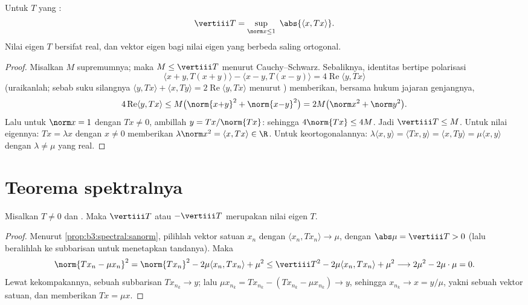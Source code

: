 \begin{proposition}\label{prop:b3:spectral:sanorm}
Untuk $T$ yang :
\[
\vertiii T = \sup_{\norm x \leq 1}\ \abs{\langle x,
Tx\rangle} .
\]
Nilai eigen $T$ bersifat real, dan vektor eigen bagi nilai eigen
yang berbeda saling ortogonal.
\end{proposition}

\begin{proof}
Misalkan $M$ supremumnya; maka $M \leq \vertiii T$ menurut
Cauchy--Schwarz. Sebaliknya, identitas bertipe polarisasi
\[
\langle x{+}y, T(x{+}y)\rangle - \langle x{-}y,
T(x{-}y)\rangle = 4\operatorname{Re}\langle y, Tx\rangle
\]
(uraikanlah; sebab suku silangnya $\langle y, Tx\rangle + \langle x,
Ty\rangle = 2\operatorname{Re}\langle y, Tx\rangle$ menurut
) memberikan, bersama hukum jajaran genjangnya,
\[
4\operatorname{Re}\langle y, Tx\rangle \leq
M\bigl(\norm{x{+}y}^2 + \norm{x{-}y}^2\bigr) = 2M\bigl(\norm
x^2 + \norm y^2\bigr).
\]
Lalu untuk $\norm x = 1$ dengan $Tx \neq 0$, ambillah $y = Tx/\norm{Tx}$:
sehingga $4\norm{Tx} \leq 4M$. Jadi $\vertiii T \leq M$. Untuk nilai eigennya:
$Tx = \lambda x$ dengan $x \ne 0$ memberikan $\lambda\norm x^2 = \langle
x, Tx\rangle \in \R$. Untuk keortogonalannya: $\lambda\langle x,
y\rangle = \langle Tx, y\rangle = \langle x, Ty\rangle =
\mu\langle x, y\rangle$ dengan $\lambda \neq \mu$ yang real.
\end{proof}

\section{Teorema spektralnya}

\begin{lemma}
\label{lem:b3:spectral:existence}
Misalkan $T \neq 0$  dan . Maka $\vertiii T$
atau $-\vertiii T$ merupakan nilai eigen $T$.
\end{lemma}

\begin{proof}
Menurut \cref{prop:b3:spectral:sanorm}, pilihlah vektor satuan $x_n$
dengan $\langle x_n, Tx_n\rangle \to \mu$, dengan $\abs\mu =
\vertiii T > 0$ (lalu beralihlah ke subbarisan untuk menetapkan tandanya). Maka
\[
\norm{Tx_n - \mu x_n}^2
= \norm{Tx_n}^2 - 2\mu\langle x_n, Tx_n\rangle + \mu^2
\leq \vertiii T^2 - 2\mu\langle x_n, Tx_n\rangle + \mu^2
\longrightarrow 2\mu^2 - 2\mu\cdot\mu = 0 .
\]
Lewat kekompakannya, sebuah subbarisan $Tx_{n_k} \to y$; lalu $\mu
x_{n_k} = Tx_{n_k} - (Tx_{n_k} - \mu x_{n_k}) \to y$, sehingga
$x_{n_k} \to x = y/\mu$, yakni sebuah vektor satuan, dan  memberikan
$Tx = \mu x$.
\end{proof}

